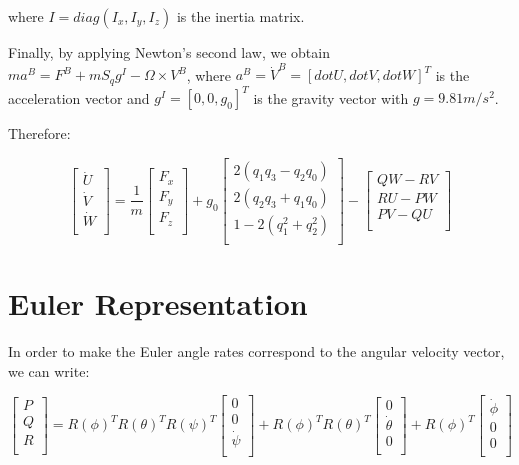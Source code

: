 where $I=diag(I_{x}, I_{y}, I_{z})$ is the inertia matrix.

Finally, by applying Newton's second law, we obtain $m a^{B}=F^{B}+m S_{q} g^{I} - \Omega \times V^{B}$, where $a^{B}=\dot{V}^{B}=[dot{U}, dot{V}, dot{W}]^{T}$ is the acceleration vector and $g^{I}=[0, 0, g_{0}]^{T}$ is the gravity vector with $g=9.81m/s^{2}$.

Therefore:

\begin{equation}
\label{S10}
 \begin{bmatrix}
 	\dot{U} \\
 	\dot{V} \\
 	\dot{W} \\
 	\end{bmatrix}= \frac{1}{m}\begin{bmatrix}
 	F_{x}  \\
 	F_{y}   \\
 	F_{z}   \\
 	\end{bmatrix} + g_{0}\begin{bmatrix}
 	2(q_{1}q_{3}-q_{2}q_{0}) \\
 	2(q_{2}q_{3}+q_{1}q_{0}) \\
 	1-2(q_{1}^{2}+q_{2}^{2}) \\
 	\end{bmatrix} - \begin{bmatrix}
 	QW -RV \\
 	RU - PW \\
 	PV - QU \\
\end{bmatrix}
\end{equation}

\section{Euler Representation}
In order to make the Euler angle rates correspond to the angular velocity vector, we can write:

\begin{equation}
\label{S11}
 \begin{bmatrix}
 	P \\
 	Q \\
 	R \\
 	\end{bmatrix}=R(\phi)^{T}R(\theta)^{T}R(\psi)^{T}\begin{bmatrix}
 	0  \\
 	0  \\
 	\dot{\psi}  \\
 	\end{bmatrix}+R(\phi)^{T}R(\theta)^{T}\begin{bmatrix}
 	0  \\
 	\dot{\theta}  \\
 	0  \\
 	\end{bmatrix}+R(\phi)^{T}\begin{bmatrix}
 	\dot{\phi}  \\
 	0  \\
 	0  \\
\end{bmatrix}
\end{equation}

